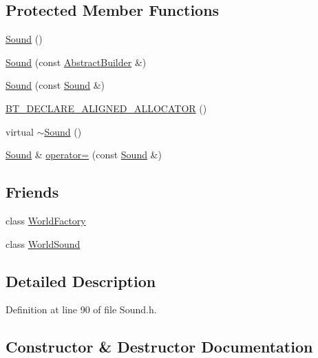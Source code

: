 \subsection*{Protected Member Functions}
\begin{DoxyCompactItemize}
\item 
\mbox{\hyperlink{classnjli_1_1_sound_a5e12f6636f376b32d2c8111348db08cb}{Sound}} ()
\item 
\mbox{\hyperlink{classnjli_1_1_sound_a646fac583099c08c0c4b8f6bea667ba6}{Sound}} (const \mbox{\hyperlink{classnjli_1_1_abstract_builder}{Abstract\+Builder}} \&)
\item 
\mbox{\hyperlink{classnjli_1_1_sound_a9e7e19a78ee4e0bcdc9e5e7c3d7a7f67}{Sound}} (const \mbox{\hyperlink{classnjli_1_1_sound}{Sound}} \&)
\item 
\mbox{\hyperlink{classnjli_1_1_sound_a5292abe9fa05e3809af27839e05e146e}{B\+T\+\_\+\+D\+E\+C\+L\+A\+R\+E\+\_\+\+A\+L\+I\+G\+N\+E\+D\+\_\+\+A\+L\+L\+O\+C\+A\+T\+OR}} ()
\item 
virtual \mbox{\hyperlink{classnjli_1_1_sound_a579238f2638337c0a221b636577a9a5e}{$\sim$\+Sound}} ()
\item 
\mbox{\hyperlink{classnjli_1_1_sound}{Sound}} \& \mbox{\hyperlink{classnjli_1_1_sound_aeaf2801406eac8f11345eb664816e61d}{operator=}} (const \mbox{\hyperlink{classnjli_1_1_sound}{Sound}} \&)
\end{DoxyCompactItemize}
\subsection*{Friends}
\begin{DoxyCompactItemize}
\item 
class \mbox{\hyperlink{classnjli_1_1_sound_acb96ebb09abe8f2a37a915a842babfac}{World\+Factory}}
\item 
class \mbox{\hyperlink{classnjli_1_1_sound_ae0be99489b1d41e4e52d3692b0d9cab2}{World\+Sound}}
\end{DoxyCompactItemize}


\subsection{Detailed Description}


Definition at line 90 of file Sound.\+h.



\subsection{Constructor \& Destructor Documentation}
\mbox{\label{classnjli_1_1_sound_a5e12f6636f376b32d2c8111348db08cb}} 
